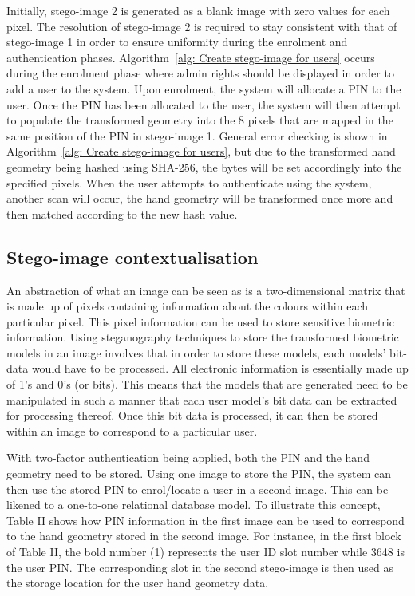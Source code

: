 
Initially, stego-image 2 is generated as a blank image with zero values for each pixel. The resolution of stego-image 2 is required to stay consistent with that of stego-image 1 in order to ensure uniformity during the enrolment and authentication phases. Algorithm~\ref{alg: Create stego-image for users} occurs during the enrolment phase where admin rights should be displayed in order to add a user to the system. Upon enrolment, the system will allocate a PIN to the user. Once the PIN has been allocated to the user, the system will then attempt to populate the transformed geometry into the 8 pixels that are mapped in the same position of the PIN in stego-image 1. General error checking is shown in Algorithm~\ref{alg: Create stego-image for users}, but due to the transformed hand geometry being hashed using SHA-256, the bytes will be set accordingly into the specified pixels. When the user attempts to authenticate using the system, another scan will occur, the hand geometry will be transformed once more and then matched according to the new hash value.

\subsection{Stego-image contextualisation}

An abstraction of what an image can be seen as is a two-dimensional matrix that is made up of pixels containing information about the colours within each particular pixel. This pixel information can be used to store sensitive biometric information. Using steganography techniques to store the transformed biometric models in an image involves that in order to store these models, each models’ bit-data would have to be processed. All electronic information is essentially made up of 1’s and 0’s (or bits). This means that the models that are generated need to be manipulated in such a manner that each user model’s bit data can be extracted for processing thereof. Once this bit data is processed, it can then be stored within an image to correspond to a particular user. 

With two-factor authentication being applied, both the PIN and the hand geometry need to be stored. Using one image to store the PIN, the system can then use the stored PIN to enrol/locate a user in a second image. This can be likened to a one-to-one relational database model. To illustrate this concept, Table II shows how PIN information in the first image can be used to correspond to the hand geometry stored in the second image. For instance, in the first block of Table II, the bold number (1) represents the user ID slot number while 3648 is the user PIN. The corresponding slot in the second stego-image is then used as the storage location for the user hand geometry data.

